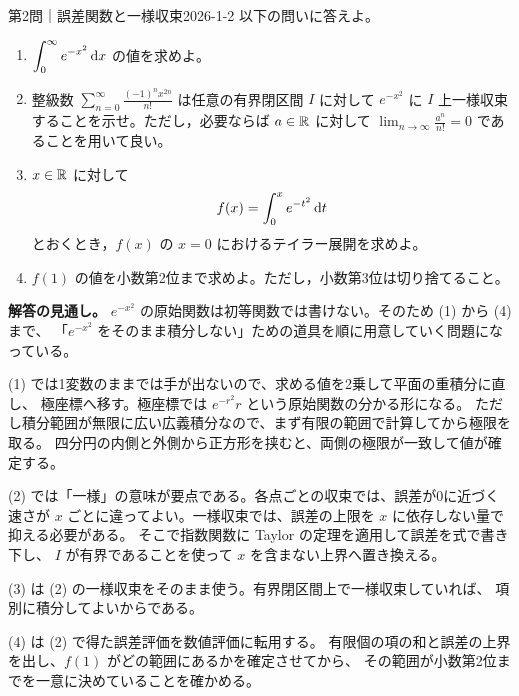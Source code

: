 \begin{problem}{第2問｜誤差関数と一様収束}{2026-1-2}
以下の問いに答えよ。
\begin{enumerate}
  \item[(1)] $\displaystyle\int_0^\infty e^{-x^2}\,\mathrm{d} x$ の値を求めよ。
  \item[(2)] 整級数 $\displaystyle\sum_{n=0}^\infty\frac{(-1)^nx^{2n}}{n!}$ は任意の有界閉区間 $I$ に対して $e^{-x^2}$ に $I$ 上一様収束することを示せ。ただし，必要ならば $a\in\mathbb{R}$ に対して $\displaystyle\lim_{n\to\infty}\frac{a^n}{n!}=0$ であることを用いて良い。
  \item[(3)] $x\in\mathbb{R}$ に対して
  \[
  f(x)=\int_0^xe^{-t^2}\,\mathrm{d} t
  \]
  とおくとき，$f(x)$ の $x=0$ におけるテイラー展開を求めよ。
  \item[(4)] $f(1)$ の値を小数第2位まで求めよ。ただし，小数第3位は切り捨てること。
\end{enumerate}
\end{problem}
\begin{memo*}
\textbf{解答の見通し。}
$e^{-x^2}$ の原始関数は初等関数では書けない。そのため (1) から (4) まで、
「$e^{-x^2}$ をそのまま積分しない」ための道具を順に用意していく問題になっている。

(1) では1変数のままでは手が出ないので、求める値を2乗して平面の重積分に直し、
極座標へ移す。極座標では $e^{-r^2}r$ という原始関数の分かる形になる。
ただし積分範囲が無限に広い広義積分なので、まず有限の範囲で計算してから極限を取る。
四分円の内側と外側から正方形を挟むと、両側の極限が一致して値が確定する。

(2) では「一様」の意味が要点である。各点ごとの収束では、誤差が0に近づく速さが
$x$ ごとに違ってよい。一様収束では、誤差の上限を $x$ に依存しない量で抑える必要がある。
そこで指数関数に Taylor の定理を適用して誤差を式で書き下し、
$I$ が有界であることを使って $x$ を含まない上界へ置き換える。

(3) は (2) の一様収束をそのまま使う。有界閉区間上で一様収束していれば、
項別に積分してよいからである。

(4) は (2) で得た誤差評価を数値評価に転用する。
有限個の項の和と誤差の上界を出し、$f(1)$ がどの範囲にあるかを確定させてから、
その範囲が小数第2位までを一意に決めていることを確かめる。
\end{memo*}
